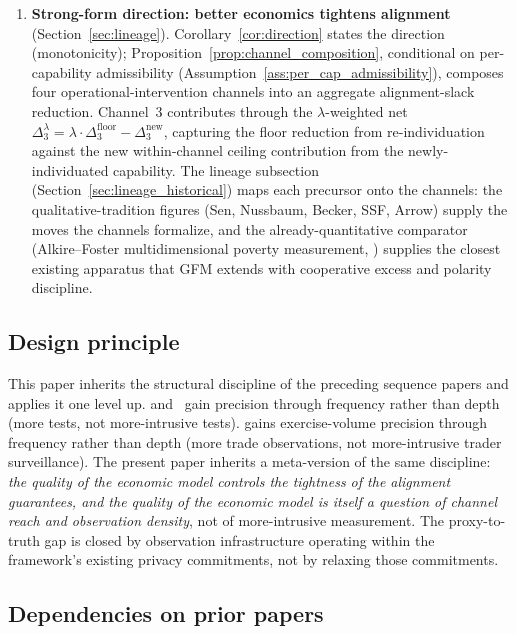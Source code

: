\begin{enumerate}
\item \textbf{Strong-form direction: better economics tightens
  alignment} (Section~\ref{sec:lineage}).
  Corollary~\ref{cor:direction} states the direction
  (monotonicity); Proposition~\ref{prop:channel_composition},
  conditional on per-capability admissibility
  (Assumption~\ref{ass:per_cap_admissibility}), composes four
  operational-intervention channels into an aggregate
  alignment-slack reduction.  Channel~3 contributes through the
  $\lambda$-weighted net $\Delta_3^{\lambda} = \lambda \cdot
  \Delta_3^{\mathrm{floor}} - \Delta_3^{\mathrm{new}}$,
  capturing the floor reduction from re-individuation against
  the new within-channel ceiling contribution from the
  newly-individuated capability.  The lineage subsection
  (Section~\ref{sec:lineage_historical}) maps each precursor onto
  the channels: the qualitative-tradition figures (Sen, Nussbaum,
  Becker, SSF, Arrow) supply the moves the channels formalize,
  and the already-quantitative comparator (Alkire--Foster
  multidimensional poverty measurement,
  \citep{alkire2011counting}) supplies the closest existing
  apparatus that GFM extends with cooperative excess and polarity
  discipline.
\end{enumerate}

\subsection{Design principle}
\label{sec:design_principle}

This paper inherits the structural discipline of the preceding
sequence papers and applies it one level up.
\citep[Phase~Redundancy]{lasser2026phase}
and~\citep[Controlled~Relaxation]{lasser2026wamura} gain
precision through frequency rather than depth (more tests, not
more-intrusive tests).
\citep[Revealed~Sacrifice]{lasser2026paper8a} gains
exercise-volume precision through frequency rather than depth
(more trade observations, not more-intrusive trader surveillance).
The present paper inherits a meta-version of the same discipline:
\emph{the quality of the economic model controls the tightness of
the alignment guarantees, and the quality of the economic model
is itself a question of channel reach and observation density},
not of more-intrusive measurement.  The proxy-to-truth gap is
closed by observation infrastructure operating within the
framework's existing privacy commitments, not by relaxing those
commitments.

\subsection{Dependencies on prior papers}
\label{sec:dependencies}

